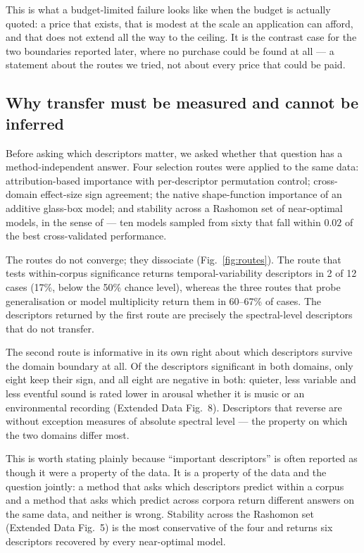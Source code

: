 This is what a budget-limited failure looks like when the budget is actually
quoted: a price that exists, that is modest at the scale an application can afford,
and that does not extend all the way to the ceiling. It is the contrast case for
the two boundaries reported later, where no purchase could be found at all --- a
statement about the routes we tried, not about every price that could be paid.

\subsection*{Why transfer must be measured and cannot be inferred}

Before asking which descriptors matter, we asked whether that question has a
method-independent answer. Four selection routes were applied to the same data:
attribution-based importance with per-descriptor permutation control; cross-domain
effect-size sign agreement; the native shape-function importance of an additive
glass-box model; and stability across a Rashomon set of near-optimal models, in the
sense of \citet{breiman2001} --- ten models sampled from sixty that fall within
$0.02$ of the best cross-validated performance.

The routes do not converge; they dissociate (Fig.~\ref{fig:routes}). The route that
tests within-corpus significance returns temporal-variability descriptors in 2 of
12 cases (17\%, below the 50\% chance level), whereas the three routes that probe
generalisation or model multiplicity return them in 60--67\% of cases. The
descriptors returned by the first route are precisely the spectral-level
descriptors that do not transfer.

The second route is informative in its own right about which descriptors survive
the domain boundary at all. Of the descriptors significant in both domains, only
eight keep their sign, and all eight are negative in both: quieter, less variable
and less eventful sound is rated lower in arousal whether it is music or an
environmental recording (Extended Data Fig.~8). Descriptors that reverse are
without exception measures of absolute spectral level --- the property on which the
two domains differ most.

This is worth stating plainly because ``important descriptors'' is often reported
as though it were a property of the data. It is a property of the data and the
question jointly: a method that asks which descriptors predict within a corpus and
a method that asks which predict across corpora return different answers on the
same data, and neither is wrong. Stability across the Rashomon set (Extended Data
Fig.~5) is the most conservative of the four and returns six descriptors recovered
by every near-optimal model.

